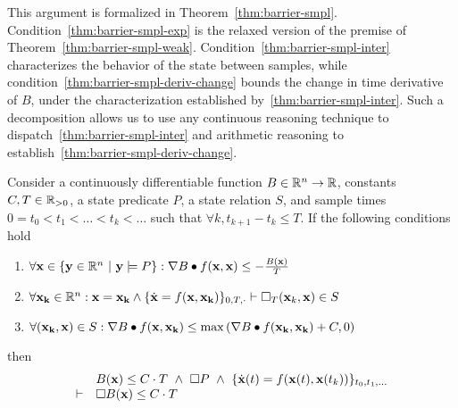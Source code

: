 This argument is formalized in
Theorem~\ref{thm:barrier-smpl}. Condition~\eqref{thm:barrier-smpl-exp} is
the relaxed version of the premise of
Theorem~\ref{thm:barrier-smpl-weak}. Condition~\eqref{thm:barrier-smpl-inter}
characterizes the behavior of the state between samples, while
condition~\eqref{thm:barrier-smpl-deriv-change} bounds the change in time
derivative of $B$, under the characterization established
by~\eqref{thm:barrier-smpl-inter}. Such a decomposition allows us to use
any continuous reasoning technique to
dispatch~\eqref{thm:barrier-smpl-inter} and arithmetic reasoning to
establish~\eqref{thm:barrier-smpl-deriv-change}.

\begin{theorem}
Consider a continuously differentiable function $B \in \mathbb{R}^n \rightarrow
\mathbb{R}$, constants $C,T \in \mathbb{R}_{> 0}$, a state predicate $P$, a state relation
$S$, and sample times $0 = t_0 < t_1 < \ldots < t_k < \ldots$ such that
$\forall k, t_{k+1} - t_k \leq T$. If the following conditions hold

\begin{enumerate}[label=\roman*), ref=\roman*]
\item
\label{thm:barrier-smpl-exp}
$\forall \mathbf{x} \in \{\mathbf{y} \in \mathbb{R}^n~|~\mathbf{y} \models P\} : \nabla B \bullet f(\mathbf{x},\mathbf{x}) \leq -\frac{B(\mathbf{x})}{T}$
\item
\label{thm:barrier-smpl-inter}
$\forall \mathbf{x_k} \in \mathbb{R}^n : \mathbf{x} = \mathbf{x_k} \wedge \{\dot{\mathbf{x}} = f(\mathbf{x},\mathbf{x_k})\}_{0,T,\cdot} \vdash \Box{}_{T} (\mathbf{x}_k,\mathbf{x}) \in S$
\item
\label{thm:barrier-smpl-deriv-change}
$\forall (\mathbf{x_k}, \mathbf{x}) \in S : \nabla B \bullet f(\mathbf{x},\mathbf{x_k}) \leq \max{(\nabla B \bullet f(\mathbf{x_k},\mathbf{x_k}) + C,0)}$
\end{enumerate}
then
\[
\begin{array}{cl}
&
B(\mathbf{x}) \leq C \cdot T~\wedge~
\Box{} P~\wedge~
\{\dot{\mathbf{x}}(t) = f(\mathbf{x}(t),\mathbf{x}(t_k))\}_{t_0,t_1,\ldots} \\
\vdash
&
\Box{} B(\mathbf{x}) \leq C \cdot T
\end{array}
\]
\label{thm:barrier-smpl}
\end{theorem}
